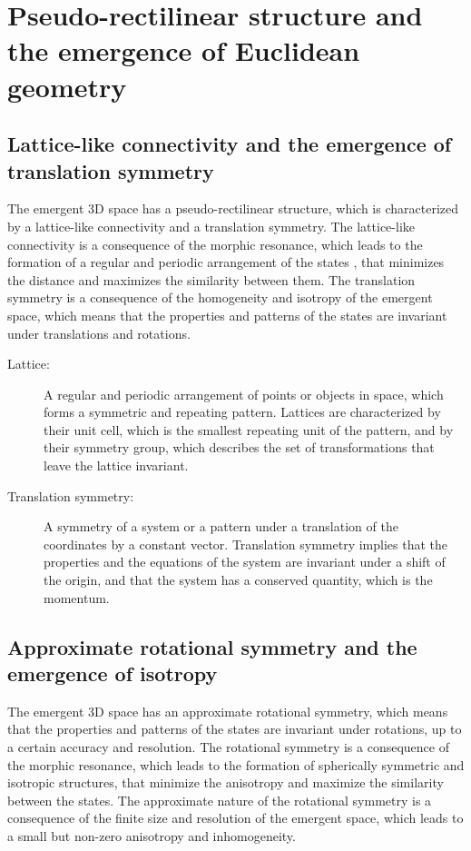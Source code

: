 \section{Pseudo-rectilinear structure and the emergence of Euclidean geometry}
\subsection{Lattice-like connectivity and the emergence of translation symmetry}
The emergent 3D space has a pseudo-rectilinear structure, which is characterized by a lattice-like connectivity and a translation symmetry. The lattice-like connectivity is a consequence of the morphic resonance, which leads to the formation of a regular and periodic arrangement of the states , that minimizes the distance and maximizes the similarity between them. The translation symmetry is a consequence of the homogeneity and isotropy of the emergent space, which means that the properties and patterns of the states are invariant under translations and rotations.

\begin{tcolorbox}[colback=blue!5!white,colframe=blue!75!black,title=New terms]
\begin{description}
\item[Lattice:] A regular and periodic arrangement of points or objects in space, which forms a symmetric and repeating pattern. Lattices are characterized by their unit cell, which is the smallest repeating unit of the pattern, and by their symmetry group, which describes the set of transformations that leave the lattice invariant.
\item[Translation symmetry:] A symmetry of a system or a pattern under a translation of the coordinates by a constant vector. Translation symmetry implies that the properties and the equations of the system are invariant under a shift of the origin, and that the system has a conserved quantity, which is the momentum.
\end{description}
\end{tcolorbox}

\subsection{Approximate rotational symmetry and the emergence of isotropy}
The emergent 3D space has an approximate rotational symmetry, which means that the properties and patterns of the states are invariant under rotations, up to a certain accuracy and resolution. The rotational symmetry is a consequence of the morphic resonance, which leads to the formation of spherically symmetric and isotropic structures, that minimize the anisotropy and maximize the similarity between the states. The approximate nature of the rotational symmetry is a consequence of the finite size and resolution of the emergent space, which leads to a small but non-zero anisotropy and inhomogeneity.


